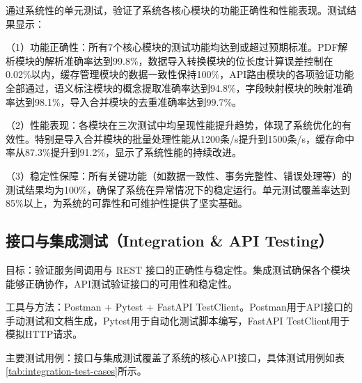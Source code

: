 \begin{table}[H]
\centering
\caption{导入合并模块单元测试结果}
\label{tab:import-merge-test}
\end{table}

通过系统性的单元测试，验证了系统各核心模块的功能正确性和性能表现。测试结果显示：

（1）功能正确性：所有7个核心模块的测试功能均达到或超过预期标准。PDF解析模块的解析准确率达到99.8\%，数据导入转换模块的位长度计算误差控制在0.02\%以内，缓存管理模块的数据一致性保持100\%，API路由模块的各项验证功能全部通过，语义标注模块的概念提取准确率达到94.8\%，字段映射模块的映射准确率达到98.1\%，导入合并模块的去重准确率达到99.7\%。

（2）性能表现：各模块在三次测试中均呈现性能提升趋势，体现了系统优化的有效性。特别是导入合并模块的批量处理性能从1200条/s提升到1500条/s，缓存命中率从87.3\%提升到91.2\%，显示了系统性能的持续改进。

（3）稳定性保障：所有关键功能（如数据一致性、事务完整性、错误处理等）的测试结果均为100\%，确保了系统在异常情况下的稳定运行。单元测试覆盖率达到85\%以上，为系统的可靠性和可维护性提供了坚实基础。


\subsection{接口与集成测试（Integration \& API Testing）}

目标：验证服务间调用与 REST 接口的正确性与稳定性。集成测试确保各个模块能够正确协作，API测试验证接口的可用性和稳定性。

工具与方法：Postman + Pytest + FastAPI TestClient。Postman用于API接口的手动测试和文档生成，Pytest用于自动化测试脚本编写，FastAPI TestClient用于模拟HTTP请求。

主要测试用例：接口与集成测试覆盖了系统的核心API接口，具体测试用例如表\ref{tab:integration-test-cases}所示。

